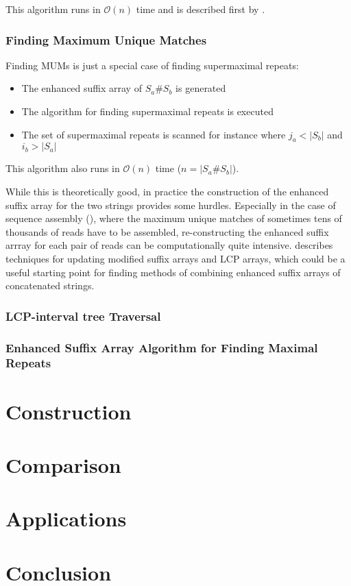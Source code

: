 \documentclass[a4paper,10pt]{article}
\begin{document}
This algorithm runs in $\mathcal{O}(n)$ time and is described first by
\citealt{abouelhoda2002enhanced}.

\subsubsection*{Finding Maximum Unique Matches}

Finding MUMs is just a special case of finding supermaximal repeats:

\begin{itemize}
\item The enhanced suffix array of $S_a\#S_b$ is generated
\item The algorithm for finding supermaximal repeats is executed
\item The set of supermaximal repeats is scanned for instance where $j_a<|S_b|$ and $i_b>|S_a|$
\end{itemize}

This algorithm also runs in $\mathcal{O}(n)$ time ($n=|S_a\#S_b|$).

While this is theoretically good, in practice the construction
of the enhanced suffix array for the two strings provides
some hurdles. Especially in the case of sequence assembly
(\citealt{myers2000whole}), where the maximum unique matches of sometimes
tens of thousands of reads have to be assembled, re-constructing the
enhanced suffix arrray for each pair of reads can be computationally
quite intensive. \citealt{salson2010dynamic} describes techniques for
updating modified suffix arrays and LCP arrays, which could be a useful
starting point for finding methods of combining enhanced suffix arrays
of concatenated strings.

\subsubsection*{LCP-interval tree Traversal}

\subsubsection*{Enhanced Suffix Array Algorithm for Finding Maximal Repeats}

\section*{Construction}

\section*{Comparison}

\section*{Applications}


\section*{Conclusion}



\end{document}
